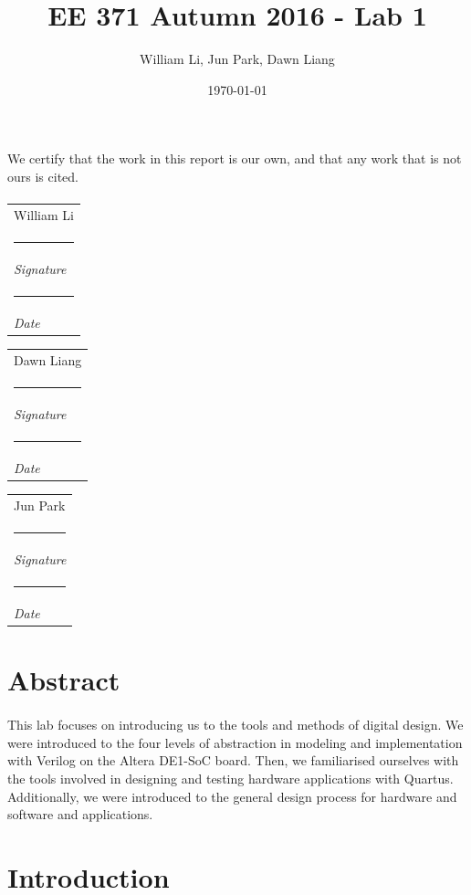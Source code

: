 \documentclass{article}
\title{EE 371 Autumn 2016 - Lab 1}
\date{\today}
\author{William Li, Jun Park, Dawn Liang}
\begin{document}
\newcommand{\namesigdate}[2][5cm]{
  \begin{tabular}{@{}p{#1}@{}}
    #2 \\[2\normalbaselineskip] \hrule \\[0pt]
    {\small \textit{Signature}} \\[2\normalbaselineskip] \hrule \\[0pt]
    {\small \textit{Date}}
  \end{tabular}
}

\maketitle
\newpage

\paragraph{} We certify that the work in this report is our own, and that any work that is not ours is cited.

\paragraph{} \noindent \namesigdate{William Li} \hfill \namesigdate{Dawn Liang} \hfill \namesigdate{Jun Park}
\newpage

\tableofcontents
\newpage


\section{Abstract}
\paragraph{} This lab focuses on introducing us to the tools and methods of digital design. We were introduced to the four levels of abstraction in modeling and implementation with Verilog on the Altera DE1-SoC board. Then, we familiarised ourselves with the tools involved in designing and testing hardware applications with Quartus. Additionally, we were introduced to the general design process for hardware and software and applications.

\section{Introduction}
\end{document}
